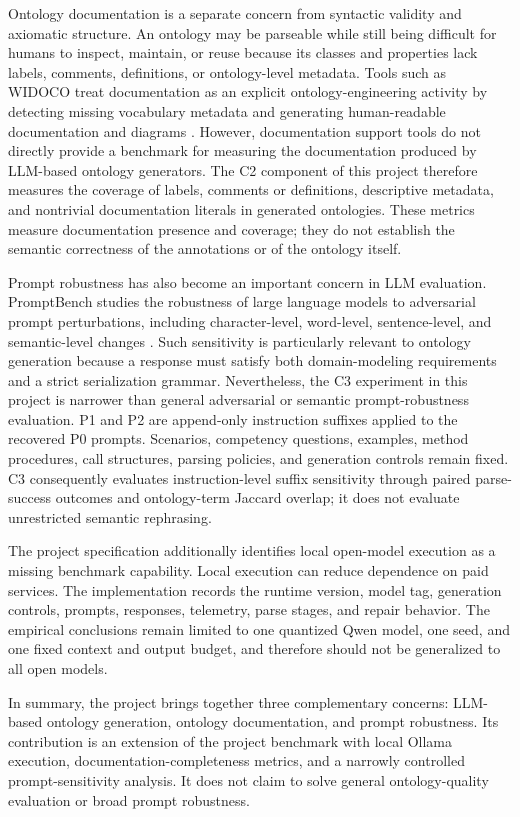 \documentclass[11pt,a4paper]{article}
\begin{document}
Ontology documentation is a separate concern from syntactic validity and
axiomatic structure. An ontology may be parseable while still being difficult
for humans to inspect, maintain, or reuse because its classes and properties
lack labels, comments, definitions, or ontology-level metadata. Tools such as
WIDOCO treat documentation as an explicit ontology-engineering activity by
detecting missing vocabulary metadata and generating human-readable
documentation and diagrams \cite{garijo2017widoco}. However, documentation
support tools do not directly provide a benchmark for measuring the
documentation produced by LLM-based ontology generators. The C2 component of
this project therefore measures the coverage of labels, comments or
definitions, descriptive metadata, and nontrivial documentation literals in
generated ontologies. These metrics measure documentation presence and
coverage; they do not establish the semantic correctness of the annotations or
of the ontology itself.

Prompt robustness has also become an important concern in LLM evaluation.
PromptBench studies the robustness of large language models to adversarial
prompt perturbations, including character-level, word-level, sentence-level,
and semantic-level changes \cite{zhu2023promptbench}. Such sensitivity is
particularly relevant to ontology generation because a response must satisfy
both domain-modeling requirements and a strict serialization grammar.
Nevertheless, the C3 experiment in this project is narrower than general
adversarial or semantic prompt-robustness evaluation. P1 and P2 are append-only
instruction suffixes applied to the recovered P0 prompts. Scenarios,
competency questions, examples, method procedures, call structures, parsing
policies, and generation controls remain fixed. C3 consequently evaluates
instruction-level suffix sensitivity through paired parse-success outcomes and
ontology-term Jaccard overlap; it does not evaluate unrestricted semantic
rephrasing.

The project specification additionally identifies local open-model execution
as a missing benchmark capability. Local execution can reduce dependence on
paid services. The implementation records the runtime version, model tag,
generation controls, prompts, responses, telemetry, parse stages, and repair
behavior. The empirical conclusions remain limited to one quantized Qwen model,
one seed, and one fixed context and output budget, and therefore should not be
generalized to all open models.

In summary, the project brings together three complementary concerns:
LLM-based ontology generation, ontology documentation, and prompt robustness.
Its contribution is an extension of the project benchmark with local Ollama
execution, documentation-completeness metrics, and a narrowly
controlled prompt-sensitivity analysis. It does not claim to solve general
ontology-quality evaluation or broad prompt robustness.
\end{document}
